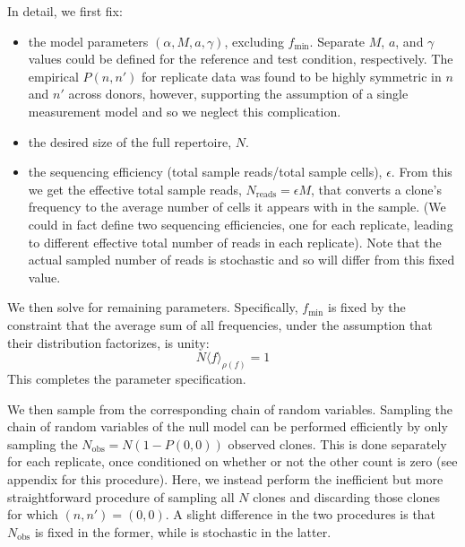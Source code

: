\documentclass[letterpaper,english,prl,reprint,longbibliography]{revtex4-1} %
\begin{document}
In detail, we first fix:
\begin{itemize}
\item  the model parameters $(\alpha,M,a,\gamma)$, excluding $f_{\textrm{min}}$. Separate $M$, $a$, and $\gamma$ values could be defined for the reference and test condition, respectively. The empirical $P(n,n')$ for replicate data was found to be highly symmetric in $n$ and $n'$ across donors, however, supporting the assumption of a single measurement model and so we neglect this complication. 
\item  the desired size of the full repertoire, $N$. 
\item the sequencing efficiency (total sample reads/total sample cells), $\epsilon$. From this we get the effective total sample reads, $N_{\textrm{reads}}=\epsilon M$, that converts a clone's frequency to the average number of cells it appears with in the sample. (We could in fact define two sequencing efficiencies, one for each replicate, leading to different effective total number of reads in each replicate). Note that the actual sampled number of reads is stochastic and so will differ from this fixed value.
\end{itemize}
We then solve for remaining parameters. Specifically, $f_{\textrm{min}}$ is fixed by the constraint that the average sum of all frequencies, under the assumption that their distribution factorizes, is unity:
\begin{equation}
	N \langle f\rangle_{\rho(f)}=1
\end{equation}
This completes the parameter specification.

We then sample from the corresponding chain of random variables.
Sampling the chain of random variables of the null model can be performed efficiently by only sampling the $N_{\textrm{obs}}=N(1-P(0,0))$ observed clones. This is done separately for each replicate, once conditioned on whether or not the other count is zero (see appendix for this procedure). Here, we instead perform the inefficient but more straightforward procedure of sampling all $N$ clones and discarding those clones for which $(n,n')=(0,0)$. A slight difference in the two procedures is that $N_{\textrm{obs}}$ is fixed in the former, while is stochastic in the latter.
\end{document}

